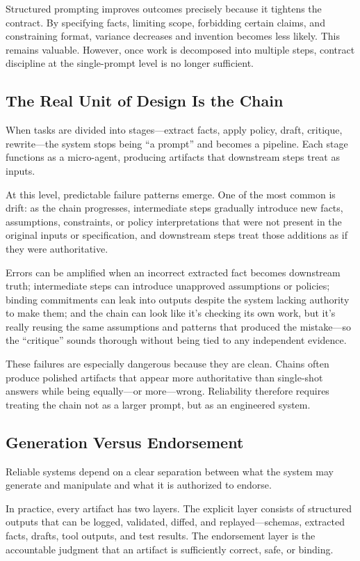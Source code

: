 Structured prompting improves outcomes precisely because it tightens the contract. By specifying facts, limiting scope, forbidding certain claims, and constraining format, variance decreases and invention becomes less likely. This remains valuable. However, once work is decomposed into multiple steps, contract discipline at the single-prompt level is no longer sufficient.

\subsection{The Real Unit of Design Is the Chain}
When tasks are divided into stages---extract facts, apply policy, draft, critique, rewrite---the system stops being ``a prompt'' and becomes a pipeline. Each stage functions as a micro-agent, producing artifacts that downstream steps treat as inputs.

At this level, predictable failure patterns emerge. One of the most common is drift: as the chain progresses, intermediate steps gradually introduce new facts, assumptions, constraints, or policy interpretations that were not present in the original inputs or specification, and downstream steps treat those additions as if they were authoritative.

Errors can be amplified when an incorrect extracted fact becomes downstream truth; intermediate steps can introduce unapproved assumptions or policies; binding commitments can leak into outputs despite the system lacking authority to make them; and the chain can look like it's checking its own work, but it's really reusing the same assumptions and patterns that produced the mistake---so the ``critique'' sounds thorough without being tied to any independent evidence.

These failures are especially dangerous because they are clean. Chains often produce polished artifacts that appear more authoritative than single-shot answers while being equally---or more---wrong. Reliability therefore requires treating the chain not as a larger prompt, but as an engineered system. 

\subsection{Generation Versus Endorsement}
Reliable systems depend on a clear separation between what the system may generate and manipulate and what it is authorized to endorse.

In practice, every artifact has two layers. The explicit layer consists of structured outputs that can be logged, validated, diffed, and replayed---schemas, extracted facts, drafts, tool outputs, and test results. The endorsement layer is the accountable judgment that an artifact is sufficiently correct, safe, or binding.

